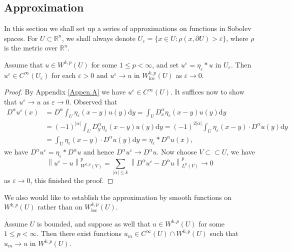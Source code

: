 \subsection{Approximation}
In this section we shall set up a series of approximations on functions in Sobolev spaces. For $U\subset\mathbb{R}^n$, we shall always denote $U_\varepsilon=\{x\in U:\rho(x,\partial U)>\varepsilon\}$, where $\rho$ is the metric over $\mathbb{R}^n$.
\begin{theorem}
Assume that $u\in W^{k,p}(U)$ for some $1\le p<\infty$, and set $u^\varepsilon=\eta_\varepsilon*u$ in $U_\varepsilon$. Then $u^\varepsilon\in C^\infty(U_\varepsilon)$ for each $\varepsilon>0$ and $u^\varepsilon\to u$ in $W_{\mathrm{loc}}^{k,p}(U)$ as $\varepsilon\to 0$.
\end{theorem}
\begin{proof}
By Appendix \ref{Appen.A} we have $u^\varepsilon\in C^\infty(U)$. It suffices now to show that $u^\varepsilon\to u$ as $\varepsilon\to 0$. Observed that 
$$
\begin{aligned}
D^{\alpha}u^{\varepsilon}\left( x \right) &=D^{\alpha}\int_U{\eta _{\varepsilon}\left( x-y \right) u\left( y \right) \mathrm{d}y}=\int_U{D_{x}^{\alpha}\eta _{\varepsilon}\left( x-y \right) u\left( y \right) \mathrm{d}y}
\\
&=\left( -1 \right) ^{\left| \alpha \right|}\int_U{D_{y}^{\alpha}\eta _{\varepsilon}\left( x-y \right) u\left( y \right) \mathrm{d}y}=\left( -1 \right) ^{2\left| \alpha \right|}\int_U{\eta _{\varepsilon}\left( x-y \right) \cdot D^{\alpha}u\left( y \right) \mathrm{d}y}
\\
&=\int_U{\eta _{\varepsilon}\left( x-y \right) \cdot D^{\alpha}u\left( y \right) \mathrm{d}y}=\eta _{\varepsilon}*D^{\alpha}u\left( x \right) ,
\end{aligned}
$$
we have $D^\alpha u^\varepsilon=\eta_\varepsilon*D^\alpha u$ and hence $D^\alpha u^\varepsilon\to D^\alpha u$. Now choose $V\subset\subset U$, we have 
$$
\left\| u^{\varepsilon}-u \right\| _{W^{k,p}\left( V \right)}^{p}=\sum_{\left| \alpha \right|\le k}{\left\| D^{\alpha}u^{\varepsilon}-D^{\alpha}u \right\| _{L^p\left( V \right)}^{p}}\rightarrow 0
$$
as $\varepsilon\to 0$, this finished the proof.
\end{proof}
We also would like to establish the approximation by smooth functions on $W^{k,p}(U)$ rather than on $W_{\mathrm{loc}}^{k,p}(U)$.
\begin{theorem}\label{Thm4.3.2}
Assume $U$ is bounded, and suppose as well that $u\in W^{k,p}(U)$ for some $1\le p<\infty$. Then there exist functions $u_m\in C^\infty(U)\cap W^{k,p}(U)$ such that $u_m\to u$ in $W^{k,p}(U)$.
\end{theorem}

